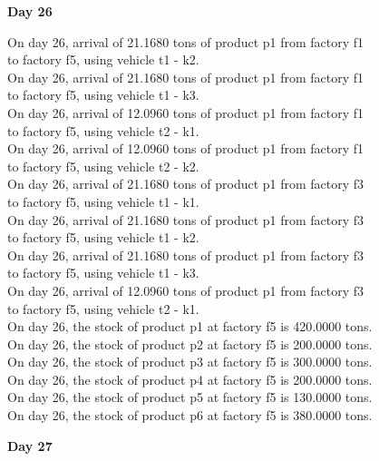 \begin{table}[H]
\begin{multicols}{2}
\begin{tabbing}
\end{tabbing} \vspace{-2.0em}
\textbf{Day 26}
\vspace{-1.6em}
\begin{tabbing}
On day 26, arrival of 21.1680 tons of product p1 from factory f1 \\ to factory f5, using vehicle t1 - k2. \\
On day 26, arrival of 21.1680 tons of product p1 from factory f1 \\ to factory f5, using vehicle t1 - k3. \\
On day 26, arrival of 12.0960 tons of product p1 from factory f1 \\ to factory f5, using vehicle t2 - k1. \\
On day 26, arrival of 12.0960 tons of product p1 from factory f1 \\ to factory f5, using vehicle t2 - k2. \\
On day 26, arrival of 21.1680 tons of product p1 from factory f3 \\ to factory f5, using vehicle t1 - k1. \\
On day 26, arrival of 21.1680 tons of product p1 from factory f3 \\ to factory f5, using vehicle t1 - k2. \\
On day 26, arrival of 21.1680 tons of product p1 from factory f3 \\ to factory f5, using vehicle t1 - k3. \\
On day 26, arrival of 12.0960 tons of product p1 from factory f3 \\ to factory f5, using vehicle t2 - k1. \\
On day 26, the stock of product p1 at factory f5 is 420.0000 tons. \\
On day 26, the stock of product p2 at factory f5 is 200.0000 tons. \\
On day 26, the stock of product p3 at factory f5 is 300.0000 tons. \\
On day 26, the stock of product p4 at factory f5 is 200.0000 tons. \\
On day 26, the stock of product p5 at factory f5 is 130.0000 tons. \\
On day 26, the stock of product p6 at factory f5 is 380.0000 tons. \\
\end{tabbing} \vspace{-2.0em}
\textbf{Day 27}
\vspace{-1.6em}
\begin{tabbing}

\end{tabbing}
\end{multicols}
\end{table}
